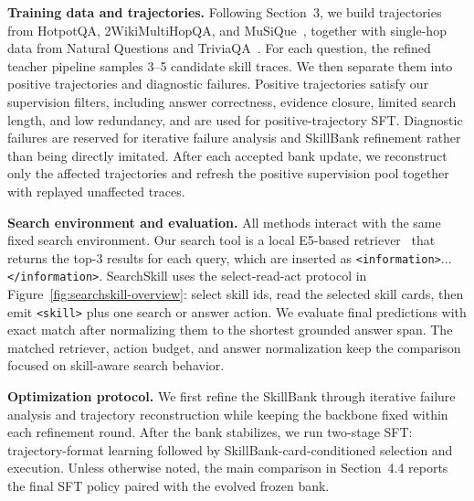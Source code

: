 \documentclass{article}
\newcommand{\tagopen}[2]{\texttt{\textcolor{#1}{<#2>}}}
\newcommand{\tagclose}[2]{\texttt{\textcolor{#1}{</#2>}}}
\begin{document}
\textbf{Training data and trajectories.} Following Section~3, we build trajectories from HotpotQA, 2WikiMultiHopQA, and MuSiQue~\citep{yang2018hotpotqa,ho2020wikimultihopqa,trivedi2022musique}, together with single-hop data from Natural Questions and TriviaQA~\citep{kwiatkowski2019naturalquestions,joshi2017triviaqa}. For each question, the refined teacher pipeline samples 3--5 candidate skill traces. We then separate them into positive trajectories and diagnostic failures. Positive trajectories satisfy our supervision filters, including answer correctness, evidence closure, limited search length, and low redundancy, and are used for positive-trajectory SFT. Diagnostic failures are reserved for iterative failure analysis and SkillBank refinement rather than being directly imitated. After each accepted bank update, we reconstruct only the affected trajectories and refresh the positive supervision pool together with replayed unaffected traces.

\textbf{Search environment and evaluation.} All methods interact with the same fixed search environment. Our search tool is a local E5-based retriever~\citep{wang2022e5} that returns the top-3 results for each query, which are inserted as \tagopen{infotagcolor}{information}...\tagclose{infotagcolor}{information}. SearchSkill uses the select-read-act protocol in Figure~\ref{fig:searchskill-overview}: select skill ids, read the selected skill cards, then emit \tagopen{skilltagcolor}{skill} plus one search or answer action. We evaluate final predictions with exact match after normalizing them to the shortest grounded answer span. The matched retriever, action budget, and answer normalization keep the comparison focused on skill-aware search behavior.

\textbf{Optimization protocol.} We first refine the SkillBank through iterative failure analysis and trajectory reconstruction while keeping the backbone fixed within each refinement round. After the bank stabilizes, we run two-stage SFT: trajectory-format learning followed by SkillBank-card-conditioned selection and execution. Unless otherwise noted, the main comparison in Section~4.4 reports the final SFT policy paired with the evolved frozen bank.
\end{document}
